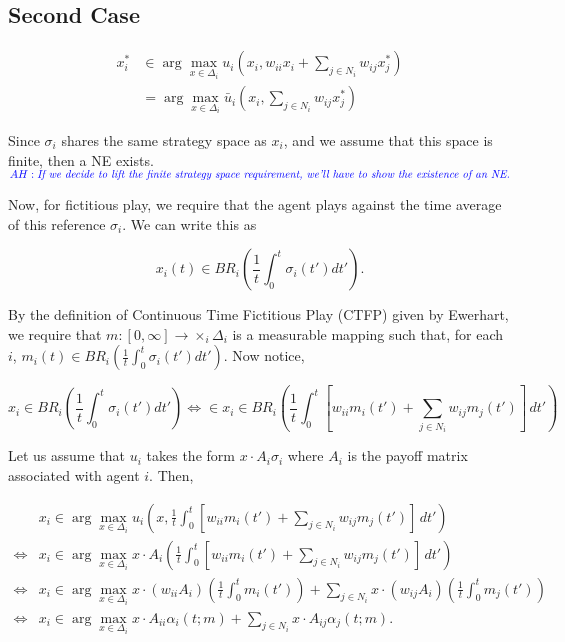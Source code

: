 \documentclass{article}
\theoremstyle{definition}
\newcommand{\ah}[1]{\textcolor{blue}{AH: \textit{#1}}}
\begin{document}
	\subsection*{Second Case}
	
	\begin{align}
		x_i^* &\in \arg\max_{x \in \Delta_i} u_i(x_i, w_{ii} x_i + \sum_{j \in N_i} w_{ij} x_j^*) \nonumber\\
		&= \arg\max_{x \in \Delta_i} \bar{u}_i(x_i, \sum_{j \in N_i} w_{ij} x_j^*)
	\end{align}
	
	Since $\sigma_i$ shares the same strategy space as $x_i$, and we assume that this space is finite, then a NE exists. $\ah{If we decide to lift the finite strategy space requirement, we'll have to show the existence of an NE.}$ 
	
	Now, for fictitious play, we require that the agent plays against the time average of this reference $\sigma_i$. We can write this as
	
	\begin{equation}
		x_i(t) \in BR_i \left( \frac{1}{t} \int_{0}^{t} \sigma_i(t') dt' \right).
	\end{equation}
	
	By the definition of Continuous Time Fictitious Play (CTFP) given by Ewerhart, we require that $m: [0, \infty] \rightarrow \times_i \Delta_i$ is a measurable mapping such that, for each $i$, $m_i(t) \in BR_i \left( \frac{1}{t} \int_{0}^{t} \sigma_i(t') dt' \right)$. Now notice,
	
	\begin{equation*}
		x_i \in BR_i \left( \frac{1}{t} \int_{0}^{t} \sigma_i(t') dt' \right) \iff  \in x_i\in BR_i \left( \frac{1}{t} \int_{0}^{t} [w_{ii} m_i(t') + \sum_{j \in N_i} w_{ij} m_j(t')] \, dt' \right)
	\end{equation*}
	
	Let us assume that $u_i$ takes the form $x \cdot A_i \sigma_i$ where $A_i$ is the payoff matrix associated with agent $i$. Then,
	
	\begin{align}
		& x_i \in \arg\max_{x \in \Delta_i} u_i(x,\frac{1}{t} \int_{0}^{t} [w_{ii} m_i(t') + \sum_{j \in N_i} w_{ij} m_j(t')] \, dt') \nonumber \\
		\iff & x_i \in \arg\max_{x \in \Delta_i} x \cdot A_i \left(\frac{1}{t} \int_{0}^{t} [w_{ii} m_i(t') + \sum_{j \in N_i} w_{ij} m_j(t')] \, dt' \right) \nonumber \\
		\iff & x_i \in \arg \max_{x \in \Delta_i} x \cdot (w_{ii} A_i) \left( \frac{1}{t} \int_{0}^{t} m_i(t')\right) + \sum_{j \in N_i} x \cdot (w_{ij} A_i) \left( \frac{1}{t} \int_{0}^{t} m_j(t')\right) \nonumber \\
		\iff & x_i \in \arg \max_{x \in \Delta_i} x \cdot A_{ii} \alpha_i(t; m) + \sum_{j \in N_i} x \cdot A_{ij} \alpha_j(t; m).
	\end{align}
	
\end{document}
